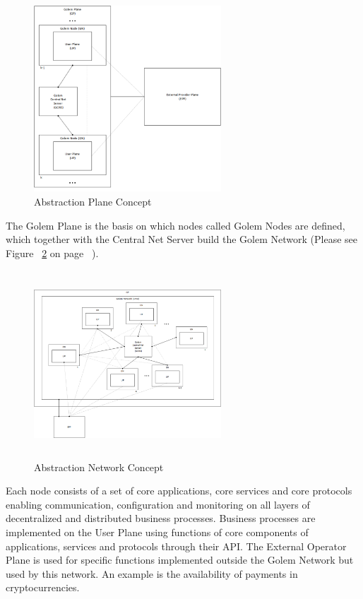 \begin{figure}[htbp]
    \centering
    \includegraphics[width=7cm,height=7cm,angle=0]{./diag/03.AbsPlane-Diag-v002.png}
    \caption{Abstraction Plane Concept}
	\label{fig:Plane}
\end{figure}

The Golem Plane is the basis on which nodes called Golem Nodes are defined, 
which together with the Central Net Server build the Golem Network 
(Please see Figure ~\ref{fig:Ntw} on page ~\pageref{fig:Ntw}).

\begin{figure}[htbp]
    \centering
    \includegraphics[width=7cm,height=7cm,angle=0]{./diag/02.AbsNtw-Diag-v002.png}
	\caption{Abstraction Network Concept}
    \label{fig:Ntw}
\end{figure}

Each node consists of a set of core applications, core services
and core protocols enabling communication, configuration and monitoring 
on all layers of decentralized and distributed business processes.
Business processes are implemented on the User Plane using functions of 
core components of applications, services and protocols through their API.
The External Operator Plane is used for specific functions implemented
outside the Golem Network but used by this network. An example is the availability of
payments in cryptocurrencies.

